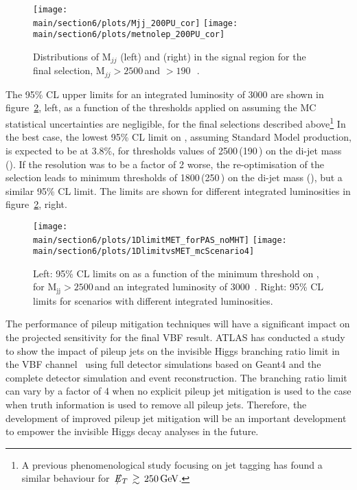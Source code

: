 \documentclass[../report.tex]{subfiles}
\providecommand{\main}{..}
\begin{document}
\begin{figure}[htbp]
  \centering
    \texttt{[image: \\main/section6/plots/Mjj\_200PU\_cor]}
    \texttt{[image: \\main/section6/plots/metnolep\_200PU\_cor]}
\caption{Distributions of M$_{jj}$ (left) and \MET (right) in the signal region for the final selection, M$_{jj}>2500$\,\UGeV and \MET$>190$\,\UGeV~\cite{CMS-PAS-FTR-18-016}.}
  \label{fig:plotsdijetmet}
\end{figure}

The 95\% CL upper limits for an integrated luminosity of 3000\fbinv
are shown in figure~\ref{fig:1Dlimits}, left, as a function of the
thresholds applied on \MET assuming the MC statistical uncertainties
are negligible, for the final selections described above\footnote{A previous phenomenological study \cite{Biekotter:2017gyu} focusing on jet tagging has found a similar behaviour for $~\MET\,\gtrsim\,250\GeV$.} In the best
case, the lowest 95\% CL limit on \BHinv, assuming Standard Model
production, is expected to be at 3.8\%, for thresholds values of
2500\,\UGeV (190\,\UGeV) on the di-jet mass (\MET). If the \MET resolution
was to be a factor of 2 worse, the re-optimisation of the selection
leads to minimum thresholds of 1800\,\UGeV (250\,\UGeV) on the di-jet mass
(\MET), but a similar 95\% CL limit. The limits are shown for
different integrated luminosities in figure~\ref{fig:1Dlimits}, right.


\begin{figure}[htbp]
  \centering
    \texttt{[image: \\main/section6/plots/1DlimitMET\_forPAS\_noMHT]}
    \hfill
    \texttt{[image: \\main/section6/plots/1DlimitvsMET\_mcScenario4]}
\caption{Left: 95\% CL limits on \BHinv as a function of the minimum threshold on \MET, for M$_{\text{jj}}>2500$\,\UGeV and an integrated luminosity of 3000\fbinv ~\cite{CMS-PAS-FTR-18-016}. Right: 95\% CL limits for scenarios with different integrated luminosities.}
  \label{fig:1Dlimits}
\end{figure}


The performance of pileup mitigation techniques will have a significant impact on the projected sensitivity for the final VBF result. ATLAS has conducted a study to show the impact of pileup jets on the invisible Higgs branching ratio limit in the VBF channel~\cite{ATL-PHYS-PUB-2018-038} using full detector simulations based on Geant4\cite{Agostinelli:2002hh,Allison:2006ve} and the complete detector simulation and event reconstruction. The branching ratio limit can vary by a factor of 4 when no explicit pileup jet mitigation is used to the case when truth information is used to remove all pileup jets. Therefore, the development of improved pileup jet mitigation will be an important development to empower the invisible Higgs decay analyses in the future.
\end{document}
